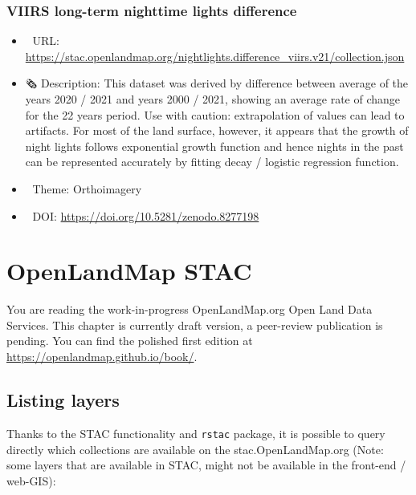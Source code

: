 \documentclass[
  graybox,natbib,nospthms]{svmono}
\providecommand{\tightlist}{%
  \setlength{\itemsep}{0pt}\setlength{\parskip}{0pt}}
\providecommand{\tightlist}{\setlength{\itemsep}{0pt}\setlength{\parskip}{0pt}}
\begin{document}
\hypertarget{viirs-long-term-nighttime-lights-difference}{%
\subsection{VIIRS long-term nighttime lights difference}\label{viirs-long-term-nighttime-lights-difference}}

\begin{itemize}
\tightlist
\item
  🔗 URL: \url{https://stac.openlandmap.org/nightlights.difference_viirs.v21/collection.json}
\item
  🗞 Description: This dataset was derived by difference between average of the years 2020 / 2021 and years 2000 / 2021, showing an average rate of change for the 22 years period. Use with caution: extrapolation of values can lead to artifacts. For most of the land surface, however, it appears that the growth of night lights follows exponential growth function and hence nights in the past can be represented accurately by fitting decay / logistic regression function.
\item
  📝 Theme: Orthoimagery
\item
  📂 DOI: \url{https://doi.org/10.5281/zenodo.8277198}
\end{itemize}

\hypertarget{openlandmap-stac}{%
\chapter{OpenLandMap STAC}\label{openlandmap-stac}}

You are reading the work-in-progress OpenLandMap.org Open Land Data Services. This chapter is currently draft version, a peer-review publication is pending. You can find the polished first edition at \url{https://openlandmap.github.io/book/}.

\hypertarget{listing-layers}{%
\section{Listing layers}\label{listing-layers}}

Thanks to the STAC functionality and \texttt{rstac} package, it is possible to query directly
which collections are available on the stac.OpenLandMap.org (Note: some layers that
are available in STAC, might not be available in the front-end / web-GIS):
\end{document}

